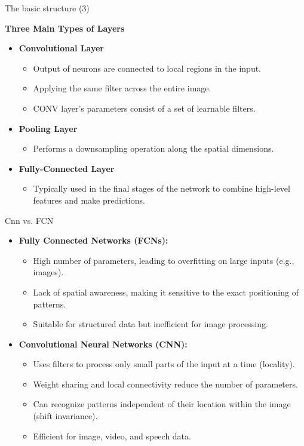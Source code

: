 \documentclass[default, aspectratio=169]{beamer}
\begin{document}
	\begin{frame}{The basic structure (3)}
		\item \textbf{Three Main Types of Layers}
		\begin{itemize}
			\item \textbf{Convolutional Layer}
			\begin{itemize}
				\item Output of neurons are connected to local regions in the input.
				\item Applying the same filter across the entire image.
				\item CONV layer’s parameters consist of a set of learnable filters.
			\end{itemize}
			\item \textbf{Pooling Layer}
			\begin{itemize}
				\item Performs a downsampling operation along the spatial dimensions.
			\end{itemize}
			\item \textbf{Fully-Connected Layer}
			\begin{itemize}
				\item Typically used in the final stages of the network to combine high-level features and make predictions.
			\end{itemize}
		\end{itemize}
	\end{frame}
	\begin{frame}{Cnn vs. FCN}
		\begin{itemize}
			\item \textbf{Fully Connected Networks (FCNs):}
			\begin{itemize}
				\item High number of parameters, leading to overfitting on large inputs (e.g., images).
				\item Lack of spatial awareness, making it sensitive to the exact positioning of patterns.
				\item Suitable for structured data but inefficient for image processing.
				
			\end{itemize}
			
			\item \textbf{Convolutional Neural Networks (CNN):}
			\begin{itemize}
				\item Uses filters to process only small parts of the input at a time (locality).
				\item Weight sharing and local connectivity reduce the number of parameters.
				\item Can recognize patterns independent of their location within the image (shift invariance).
				\item Efficient for image, video, and speech data.				
			\end{itemize}
			
		\end{itemize}
	\end{frame}
	
\end{document}
